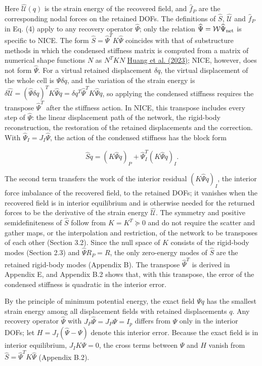 \documentclass[preprint,12pt,authoryear]{elsarticle}
\begin{document}
Here \(\widehat{\mathcal U}(q)\) is the strain energy of the recovered field, and \(\widehat f_P\) are the corresponding nodal forces on the retained DOFs. The definitions of \(\widehat S\), \(\widehat{\mathcal U}\) and \(\widehat f_P\) in Eq. (4) apply to any recovery operator \(\widehat\Psi\); only the relation \(\widehat\Psi=\mathcal W\widehat\Psi_{\rm net}\) is specific to NICE. The form \(\widehat S=\widehat\Psi^TK\widehat\Psi\) coincides with that of substructure methods in which the condensed stiffness matrix is computed from a matrix of numerical shape functions \(N\) as \(N^TKN\) \href{https://doi.org/10.1016/j.eml.2023.102041}{Huang et al. (2023)}; NICE, however, does not form \(\widehat\Psi\). For a virtual retained displacement \(\delta q\), the virtual displacement of the whole cell is \(\widehat\Psi\delta q\), and the variation of the strain energy is \(\delta\widehat{\mathcal U}=(\widehat\Psi\delta q)^TK\widehat\Psi q=\delta q^T\widehat\Psi^TK\widehat\Psi q\), so applying the condensed stiffness requires the transpose \(\widehat\Psi^T\) after the stiffness action. In NICE, this transpose includes every step of \(\widehat\Psi\): the linear displacement path of the network, the rigid-body reconstruction, the restoration of the retained displacements and the correction. With \(\widehat\Psi_I=J_I\widehat\Psi\), the action of the condensed stiffness has the block form

\[
\widehat S q=(K\widehat\Psi q)_P+\widehat\Psi_I^T(K\widehat\Psi q)_I.
\tag{5}
\]

The second term transfers the work of the interior residual \((K\widehat\Psi q)_I\), the interior force imbalance of the recovered field, to the retained DOFs; it vanishes when the recovered field is in interior equilibrium and is otherwise needed for the returned forces to be the derivative of the strain energy \(\widehat{\mathcal U}\). The symmetry and positive semidefiniteness of \(\widehat S\) follow from \(K=K^T\succeq0\) and do not require the scatter and gather maps, or the interpolation and restriction, of the network to be transposes of each other (Section 3.2). Since the null space of \(K\) consists of the rigid-body modes (Section 2.3) and \(\widehat\Psi R_P=R\), the only zero-energy modes of \(\widehat S\) are the retained rigid-body modes (Appendix B). The transpose \(\widehat\Psi^T\) is derived in Appendix E, and Appendix B.2 shows that, with this transpose, the error of the condensed stiffness is quadratic in the interior error.

By the principle of minimum potential energy, the exact field \(\Psi q\) has the smallest strain energy among all displacement fields with retained displacements \(q\). Any recovery operator \(\widehat\Psi\) with \(J_P\widehat\Psi=J_P\Psi=I_p\) differs from \(\Psi\) only in the interior DOFs; let \(H=J_I(\widehat\Psi-\Psi)\) denote this interior error. Because the exact field is in interior equilibrium, \(J_IK\Psi=0\), the cross terms between \(\Psi\) and \(H\) vanish from \(\widehat S=\widehat\Psi^TK\widehat\Psi\) (Appendix B.2).
\end{document}
